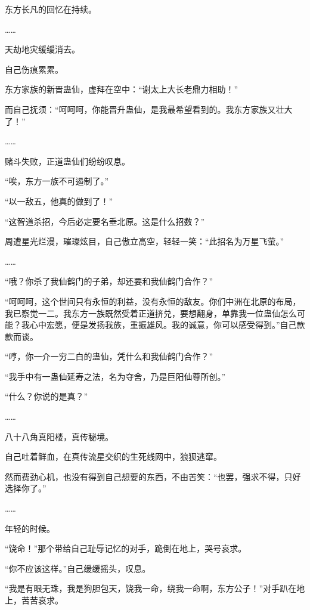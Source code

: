 
\begin{this_body}



东方长凡的回忆在持续。

……

天劫地灾缓缓消去。

自己伤痕累累。

东方家族的新晋蛊仙，虚拜在空中：“谢太上大长老鼎力相助！”

而自己抚须：“呵呵呵，你能晋升蛊仙，是我最希望看到的。我东方家族又壮大了！”

……

赌斗失败，正道蛊仙们纷纷叹息。

“唉，东方一族不可遏制了。”

“以一敌五，他真的做到了！”

“这智道杀招，今后必定要名垂北原。这是什么招数？”

周遭星光烂漫，璀璨炫目，自己傲立高空，轻轻一笑：“此招名为万星飞萤。”

……

“哦？你杀了我仙鹤门的子弟，却还要和我仙鹤门合作？”

“呵呵呵，这个世间只有永恒的利益，没有永恒的敌友。你们中洲在北原的布局，我已察觉一二。我东方一族既然受着正道挤兑，要想翻身，单靠我一位蛊仙怎么可能？我心中宏愿，便是发扬我族，重振雄风。我的诚意，你可以感受得到。”自己款款而谈。

“哼，你一介一穷二白的蛊仙，凭什么和我仙鹤门合作？”

“我手中有一蛊仙延寿之法，名为夺舍，乃是巨阳仙尊所创。”

“什么？你说的是真？”

……

八十八角真阳楼，真传秘境。

自己吐着鲜血，在真传流星交织的生死线网中，狼狈逃窜。

然而费劲心机，也没有得到自己想要的东西，不由苦笑：“也罢，强求不得，只好选择你了。”

……

年轻的时候。

“饶命！”那个带给自己耻辱记忆的对手，跪倒在地上，哭号哀求。

“你不应该这样。”自己缓缓摇头，叹息。

“我是有眼无珠，我是狗胆包天，饶我一命，绕我一命啊，东方公子！”对手趴在地上，苦苦哀求。


\end{this_body}
